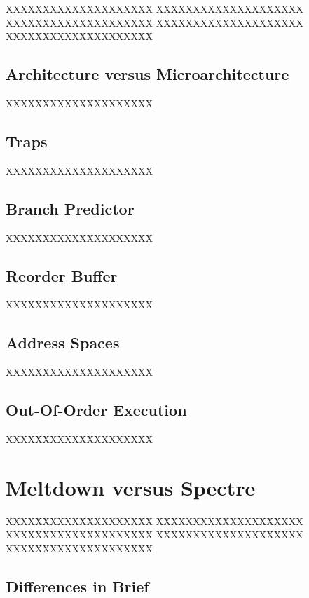 \documentclass[a4paper,oneside,openright] {scrreprt}
\begin{document}
XXXXXXXXXXXXXXXXXXXX
XXXXXXXXXXXXXXXXXXXX
XXXXXXXXXXXXXXXXXXXX
XXXXXXXXXXXXXXXXXXXX
XXXXXXXXXXXXXXXXXXXX

\section{Architecture versus Microarchitecture}
\label{ch:intro:motivation}

XXXXXXXXXXXXXXXXXXXX

\section{Traps}
\label{ch:intro:motivation}

XXXXXXXXXXXXXXXXXXXX

\section{Branch Predictor}
\label{ch:intro:motivation}

XXXXXXXXXXXXXXXXXXXX

\section{Reorder Buffer}
\label{ch:intro:motivation}

XXXXXXXXXXXXXXXXXXXX

\section{Address Spaces}
\label{ch:intro:motivation}

XXXXXXXXXXXXXXXXXXXX

\section{Out-Of-Order Execution}
\label{ch:intro:motivation}

XXXXXXXXXXXXXXXXXXXX

\chapter{Meltdown versus Spectre}
\label{ch:contentI}

XXXXXXXXXXXXXXXXXXXX
XXXXXXXXXXXXXXXXXXXX
XXXXXXXXXXXXXXXXXXXX
XXXXXXXXXXXXXXXXXXXX
XXXXXXXXXXXXXXXXXXXX

\section{Differences in Brief}
\label{ch:intro:motivation}
\end{document}
